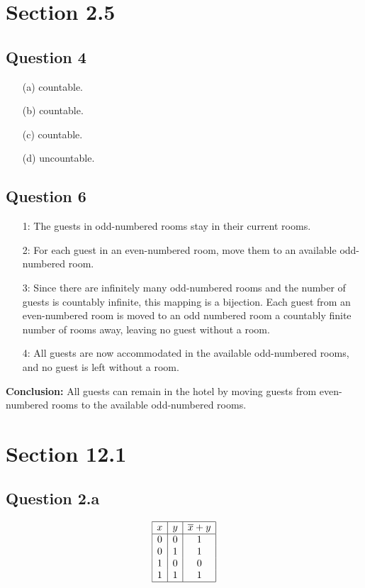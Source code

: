 \documentclass{article}
\begin{document}
\section*{Section 2.5}
\subsection*{Question 4}
\begin{itemize}
    \item[(a)] countable.
    \item[(b)] countable.
    \item[(c)] countable.
    \item[(d)] uncountable.
\end{itemize}

\subsection*{Question 6}
\begin{itemize}
    \item[1:] The guests in odd-numbered rooms stay in their current rooms.
    
    \item[2:] For each guest in an even-numbered room, move them to an available odd-numbered room.

    \item[3:] Since there are infinitely many odd-numbered rooms and the number of guests is countably infinite, this mapping is a bijection. Each guest from an even-numbered room is moved to an odd numbered room a countably finite number of rooms away, leaving no guest without a room.
    
    \item[4:] All guests are now accommodated in the available odd-numbered rooms, and no guest is left without a room.
\end{itemize}

\textbf{Conclusion:} All guests can remain in the hotel by moving guests from even-numbered rooms to the available odd-numbered rooms.


\section*{Section 12.1}
\subsection*{Question 2.a}
\[
\begin{array}{|c|c|c|}
\hline
x & y & \overline{x} + y \\
\hline
0 & 0 & 1 \\
0 & 1 & 1 \\
1 & 0 & 0 \\
1 & 1 & 1 \\
\hline
\end{array}
\]
\end{document}
